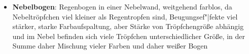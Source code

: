 \begin{itemize}
    \item
    \textbf{Nebelbogen}:
    Regenbogen in einer Nebelwand, weitgehend farblos, da
    Nebeltröpfchen viel kleiner als Regentropfen sind,
    Beugungsef"|fekte viel stärker, starke Farbaufspaltung,
    aber Stärke von Tröpfchengröße abhängig und im Nebel befinden sich
    viele Tröpfchen unterschiedlicher Größe,
    in der Summe daher Mischung vieler Farben und daher weißer Bogen
\end{itemize}

\pagebreak

